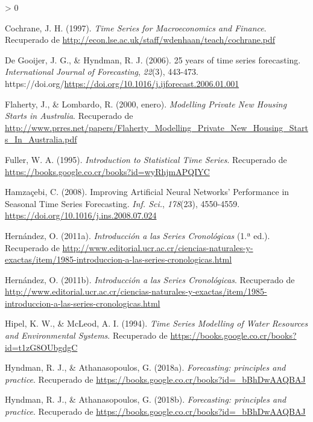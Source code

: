 \documentclass[
]{article}
\newlength{\cslhangindent}
\newenvironment{CSLReferences}[2] %
 {%
  \setlength{\parindent}{0pt}
  \ifodd #1 \everypar{\setlength{\hangindent}{\cslhangindent}}\ignorespaces\fi
  \ifnum #2 > 0
  \setlength{\parskip}{#2\baselineskip}
  \fi
 }%
 {}
\begin{document}
\begin{CSLReferences}{1}{0}
\leavevmode\hypertarget{ref-Cochrane}{}%
Cochrane, J. H. (1997). \emph{Time Series for Macroeconomics and
Finance}. Recuperado de
\url{http://econ.lse.ac.uk/staff/wdenhaan/teach/cochrane.pdf}

\leavevmode\hypertarget{ref-tsa_decades}{}%
De Gooijer, J. G., \& Hyndman, R. J. (2006). 25 years of time series
forecasting. \emph{International Journal of Forecasting}, \emph{22}(3),
443-473.
https://doi.org/\url{https://doi.org/10.1016/j.ijforecast.2006.01.001}

\leavevmode\hypertarget{ref-Lombardo}{}%
Flaherty, J., \& Lombardo, R. (2000, enero). \emph{Modelling Private New
Housing Starts in Australia}. Recuperado de
\url{http://www.prres.net/papers/Flaherty_Modelling_Private_New_Housing_Starts_In_Australia.pdf}

\leavevmode\hypertarget{ref-fuller1995introduction}{}%
Fuller, W. A. (1995). \emph{Introduction to Statistical Time Series}.
Recuperado de \url{https://books.google.co.cr/books?id=wyRhjmAPQIYC}

\leavevmode\hypertarget{ref-Hamzacebi}{}%
Hamzaçebi, C. (2008). Improving Artificial Neural Networks' Performance
in Seasonal Time Series Forecasting. \emph{Inf. Sci.}, \emph{178}(23),
4550-4559. \url{https://doi.org/10.1016/j.ins.2008.07.024}

\leavevmode\hypertarget{ref-oscarh-1}{}%
Hernández, O. (2011a). \emph{Introducción a las Series Cronológicas}
(1.ª ed.). Recuperado de
\url{http://www.editorial.ucr.ac.cr/ciencias-naturales-y-exactas/item/1985-introduccion-a-las-series-cronologicas.html}

\leavevmode\hypertarget{ref-oscarh-4}{}%
Hernández, O. (2011b). \emph{Introducción a las Series Cronológicas}.
Recuperado de
\url{http://www.editorial.ucr.ac.cr/ciencias-naturales-y-exactas/item/1985-introduccion-a-las-series-cronologicas.html}

\leavevmode\hypertarget{ref-Hipel}{}%
Hipel, K. W., \& McLeod, A. I. (1994). \emph{Time Series Modelling of
Water Resources and Environmental Systems}. Recuperado de
\url{https://books.google.co.cr/books?id=t1zG8OUbgdgC}

\leavevmode\hypertarget{ref-hyndman2018forecasting}{}%
Hyndman, R. J., \& Athanasopoulos, G. (2018a). \emph{Forecasting:
principles and practice}. Recuperado de
\url{https://books.google.co.cr/books?id=_bBhDwAAQBAJ}

\leavevmode\hypertarget{ref-hyndman_box-jenkins}{}%
Hyndman, R. J., \& Athanasopoulos, G. (2018b). \emph{Forecasting:
principles and practice}. Recuperado de
\url{https://books.google.co.cr/books?id=_bBhDwAAQBAJ}


\end{CSLReferences}
\end{document}
